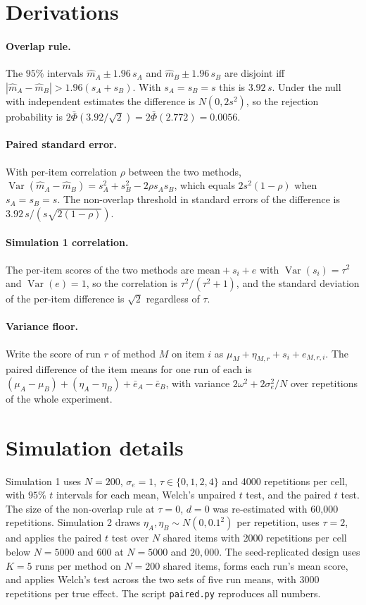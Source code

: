 \documentclass[11pt]{article}
\theoremstyle{definition}
\newcommand{\Var}{\operatorname{Var}}
\begin{document}
\appendix
\section{Derivations}

\paragraph{Overlap rule.} The $95\%$ intervals $\hat m_A\pm1.96\,s_A$ and $\hat m_B\pm1.96\,s_B$ are disjoint iff $|\hat m_A-\hat m_B|>1.96(s_A+s_B)$. With $s_A=s_B=s$ this is $3.92\,s$. Under the null with independent estimates the difference is $N(0,2s^2)$, so the rejection probability is $2\bar\Phi(3.92/\sqrt2)=2\bar\Phi(2.772)=0.0056$.

\paragraph{Paired standard error.} With per-item correlation $\rho$ between the two methods, $\Var(\hat m_A-\hat m_B)=s_A^2+s_B^2-2\rho s_As_B$, which equals $2s^2(1-\rho)$ when $s_A=s_B=s$. The non-overlap threshold in standard errors of the difference is $3.92\,s/(s\sqrt{2(1-\rho)})$.

\paragraph{Simulation 1 correlation.} The per-item scores of the two methods are $\text{mean}+s_i+e$ with $\Var(s_i)=\tau^2$ and $\Var(e)=1$, so the correlation is $\tau^2/(\tau^2+1)$, and the standard deviation of the per-item difference is $\sqrt2$ regardless of $\tau$.

\paragraph{Variance floor.} Write the score of run $r$ of method $M$ on item $i$ as $\mu_M+\eta_{M,r}+s_i+e_{M,r,i}$. The paired difference of the item means for one run of each is $(\mu_A-\mu_B)+(\eta_A-\eta_B)+\bar e_A-\bar e_B$, with variance $2\omega^2+2\sigma_e^2/N$ over repetitions of the whole experiment.

\section{Simulation details}

Simulation 1 uses $N=200$, $\sigma_e=1$, $\tau\in\{0,1,2,4\}$ and 4000 repetitions per cell, with $95\%$ $t$ intervals for each mean, Welch's unpaired $t$ test, and the paired $t$ test. The size of the non-overlap rule at $\tau=0$, $d=0$ was re-estimated with 60{,}000 repetitions. Simulation 2 draws $\eta_A,\eta_B\sim N(0,0.1^2)$ per repetition, uses $\tau=2$, and applies the paired $t$ test over $N$ shared items with 2000 repetitions per cell below $N=5000$ and 600 at $N=5000$ and $20{,}000$. The seed-replicated design uses $K=5$ runs per method on $N=200$ shared items, forms each run's mean score, and applies Welch's test across the two sets of five run means, with 3000 repetitions per true effect. The script \texttt{paired.py} reproduces all numbers.
\end{document}
